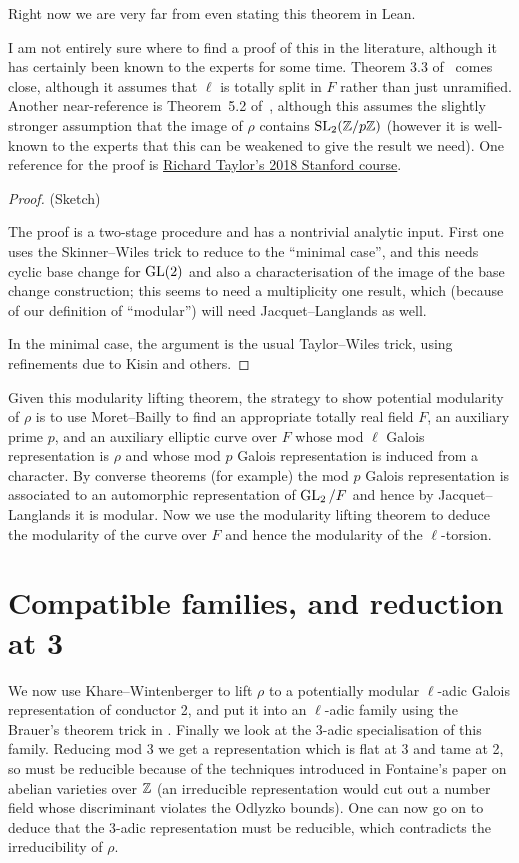 Right now we are very far from even stating this theorem in Lean. 

I am not entirely sure where to find a proof of this in the literature, although it has certainly been known to the experts for some time. Theorem 3.3 of~\cite{taylor-mero-cont} comes close, although it assumes that $\ell$ is totally split in $F$ rather than just unramified. Another near-reference is Theorem~5.2 of~\cite{toby-modularity}, although this assumes
the slightly stronger assumption that the image of $\rho$ contains $\operatorname{SL}_2(\mathbb{Z}/p\mathbb{Z})$ (however it is well-known to the experts that this can be weakened to give the result we need). One reference for the proof is \href{https://math.berkeley.edu/~fengt/249A_2018.pdf}{Richard Taylor's 2018 Stanford course}. 

\begin{proof} (Sketch)

The proof is a two-stage procedure and has a nontrivial analytic input. First one uses the Skinner--Wiles trick to reduce to the ``minimal case'', and this needs cyclic base change for $\operatorname{GL}(2)$ and also a characterisation
of the image of the base change construction; this seems to need a multiplicity one result, which (because of our
definition of ``modular'') will need Jacquet--Langlands as well.

In the minimal case, the argument is the usual Taylor--Wiles trick, using refinements due to Kisin and others.
\end{proof}

Given this modularity lifting theorem, the strategy to show potential modularity of $\rho$ is to use Moret--Bailly to find an appropriate totally real field $F$, an auxiliary prime $p$, and an auxiliary elliptic curve over $F$ whose mod $\ell$ Galois representation is $\rho$ and whose
mod $p$ Galois representation is induced from a character. By converse theorems (for example)
the mod $p$ Galois representation is associated to an automorphic representation of
$\operatorname{GL}_2/F$ and hence by Jacquet--Langlands it is modular. Now we use the
modularity lifting theorem to deduce the modularity of the curve over $F$ and hence
the modularity of the $\ell$-torsion. 

\section{Compatible families, and reduction at 3}

We now use Khare--Wintenberger to lift $\rho$ to a potentially modular $\ell$-adic
Galois representation of conductor 2, and put it into an $\ell$-adic family using
the Brauer's theorem trick in \cite{blggt}. Finally we look at the 3-adic specialisation
of this family. Reducing mod 3 we get a representation which is flat at 3 and tame at 2,
so must be reducible because
of the techniques introduced in Fontaine's paper on abelian varieties over $\mathbb{Z}$ (an irreducible
representation would cut out a number field whose discriminant violates the Odlyzko bounds).
One can now go on to deduce that the 3-adic representation must be reducible, which
contradicts the irreducibility of $\rho$.

